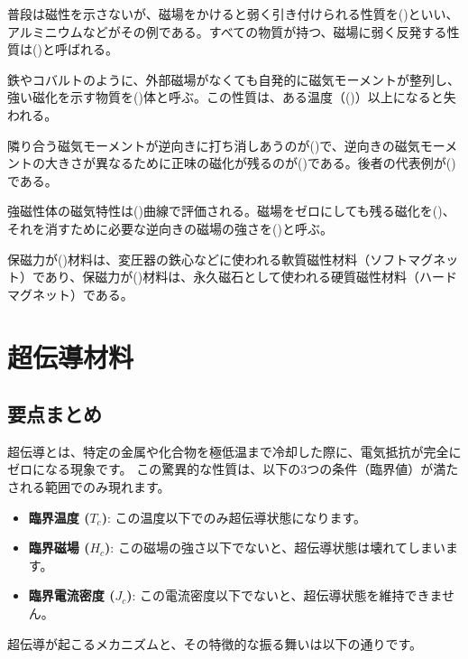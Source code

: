 \documentclass[11pt,a4paper]{ltjsarticle}
\newcommand{\blank}[1][3cm]{\underline{\hspace{#1}}}
\begin{document}
普段は磁性を示さないが、磁場をかけると弱く引き付けられる性質を(\blank[2cm])といい、アルミニウムなどがその例である。すべての物質が持つ、磁場に弱く反発する性質は(\blank[2cm])と呼ばれる。

鉄やコバルトのように、外部磁場がなくても自発的に磁気モーメントが整列し、強い磁化を示す物質を(\blank[2cm])体と呼ぶ。この性質は、ある温度（(\blank[2.5cm])）以上になると失われる。

隣り合う磁気モーメントが逆向きに打ち消しあうのが(\blank[2.5cm])で、逆向きの磁気モーメントの大きさが異なるために正味の磁化が残るのが(\blank[2.5cm])である。後者の代表例が(\blank[2cm])である。

強磁性体の磁気特性は(\blank[2.5cm])曲線で評価される。磁場をゼロにしても残る磁化を(\blank[2.5cm])、それを消すために必要な逆向きの磁場の強さを(\blank[2.5cm])と呼ぶ。

保磁力が(\blank[1.5cm])材料は、変圧器の鉄心などに使われる軟質磁性材料（ソフトマグネット）であり、保磁力が(\blank[1.5cm])材料は、永久磁石として使われる硬質磁性材料（ハードマグネット）である。

\section{超伝導材料}
\subsection{要点まとめ}
超伝導とは、特定の金属や化合物を極低温まで冷却した際に、電気抵抗が完全にゼロになる現象です。
この驚異的な性質は、以下の3つの条件（臨界値）が満たされる範囲でのみ現れます。
\begin{itemize}
    \item \textbf{臨界温度 ($T_c$)}: この温度以下でのみ超伝導状態になります。
    \item \textbf{臨界磁場 ($H_c$)}: この磁場の強さ以下でないと、超伝導状態は壊れてしまいます。
    \item \textbf{臨界電流密度 ($J_c$)}: この電流密度以下でないと、超伝導状態を維持できません。
\end{itemize}

超伝導が起こるメカニズムと、その特徴的な振る舞いは以下の通りです。
\end{document}
